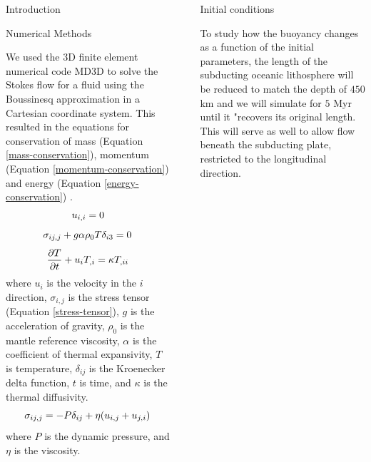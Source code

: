 \documentclass[final]{beamer}
\newlength{\sepwidth}
\newlength{\colwidth}
\newcommand{\separatorcolumn}{\begin{column}{\sepwidth}\end{column}}
\begin{document}
\begin{frame}[t]
\begin{columns}[t]
\begin{column}{\colwidth}
\begin{block}{Introduction}
  \end{block}

  \begin{block}{Numerical Methods}

    We used the 3D finite element numerical code MD3D \cite{sacek2017post} to solve the Stokes flow for a fluid using the Boussinesq approximation in a Cartesian coordinate system. This resulted in the equations for conservation of mass (Equation \ref{mass-conservation}), momentum (Equation \ref{momentum-conservation}) and energy (Equation \ref{energy-conservation}) \cite{treatise7.05}.
    \begin{equation}{\label{mass-conservation}}
        u_{i,i}=0
    \end{equation}
    \begin{equation}{\label{momentum-conservation}}
        \sigma_{ij,j}+g\alpha \rho_0 T \delta_{i3} = 0
    \end{equation}
    \begin{equation}{\label{energy-conservation}}
       \frac{\partial T}{\partial t}+u_{i}T_{,i}=\kappa T_{,ii}
    \end{equation}
    where $u_i$ is the velocity in the $i$ direction, $\sigma_{i,j}$ is the stress tensor (Equation \autoref{stress-tensor}), $g$ is the acceleration of gravity, $\rho_{0}$ is the mantle reference viscosity, $\alpha$ is the coefficient of thermal expansivity, $T$ is temperature, $\delta_{ij}$ is the Kroenecker delta function, $t$ is time, and $\kappa$ is the thermal diffusivity. %
    \begin{equation}{\label{stress-tensor}}
        \sigma_{ij,j}=-P\delta_{ij}+\eta(u_{i,j}+u_{j,i})
    \end{equation}
    where $P$ is the dynamic pressure, and $\eta$ is the viscosity.
    
  \end{block}
  
\end{column}

\separatorcolumn

\begin{column}{\colwidth}
  
  \begin{block}{Initial conditions}
  
  To study how the buoyancy changes as a function of the initial parameters, the length of the subducting oceanic lithosphere will be reduced to match the depth of $450$ km and we will simulate for $5$ Myr until it "recovers its original length. This will serve as well to allow flow beneath the subducting plate, restricted to the longitudinal direction.
  

\end{block}
\end{column}
\end{columns}
\end{frame}
\end{document}
